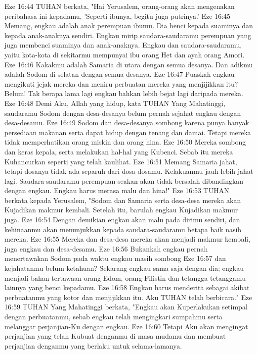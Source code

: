 Eze 16:44  TUHAN berkata, "Hai Yerusalem, orang-orang akan mengenakan peribahasa ini kepadamu, 'Seperti ibunya, begitu juga putrinya.'
Eze 16:45  Memang, engkau adalah anak perempuan ibumu. Dia benci kepada suaminya dan kepada anak-anaknya sendiri. Engkau mirip saudara-saudaramu perempuan yang juga membenci suaminya dan anak-anaknya. Engkau dan saudara-saudaramu, yaitu kota-kota di sekitarmu mempunyai ibu orang Het dan ayah orang Amori.
Eze 16:46  Kakakmu adalah Samaria di utara dengan semua desanya. Dan adikmu adalah Sodom di selatan dengan semua desanya.
Eze 16:47  Puaskah engkau mengikuti jejak mereka dan meniru perbuatan mereka yang menjijikkan itu? Belum! Tak berapa lama lagi engkau bahkan lebih bejat lagi daripada mereka.
Eze 16:48  Demi Aku, Allah yang hidup, kata TUHAN Yang Mahatinggi, saudaramu Sodom dengan desa-desanya belum pernah sejahat engkau dengan desa-desamu.
Eze 16:49  Sodom dan desa-desanya sombong karena punya banyak persediaan makanan serta dapat hidup dengan tenang dan damai. Tetapi mereka tidak memperhatikan orang miskin dan orang hina.
Eze 16:50  Mereka sombong dan keras kepala, serta melakukan hal-hal yang Kubenci. Sebab itu mereka Kuhancurkan seperti yang telah kaulihat.
Eze 16:51  Memang Samaria jahat, tetapi dosanya tidak ada separuh dari dosa-dosamu. Kelakuanmu jauh lebih jahat lagi. Saudara-saudaramu perempuan seakan-akan tidak bersalah dibandingkan dengan engkau. Engkau harus merasa malu dan hina!"
Eze 16:53  TUHAN berkata kepada Yerusalem, "Sodom dan Samaria serta desa-desa mereka akan Kujadikan makmur kembali. Setelah itu, barulah engkau Kujadikan makmur juga.
Eze 16:54  Dengan demikian engkau akan malu pada dirimu sendiri, dan kehinaanmu akan menunjukkan kepada saudara-saudaramu betapa baik nasib mereka.
Eze 16:55  Mereka dan desa-desa mereka akan menjadi makmur kembali, juga engkau dan desa-desamu.
Eze 16:56  Bukankah engkau pernah menertawakan Sodom pada waktu engkau masih sombong
Eze 16:57  dan kejahatanmu belum ketahuan? Sekarang engkau sama saja dengan dia; engkau menjadi bahan tertawaan orang Edom, orang Filistin dan tetangga-tetanggamu lainnya yang benci kepadamu.
Eze 16:58  Engkau harus menderita sebagai akibat perbuatanmu yang kotor dan menjijikkan itu. Aku TUHAN telah berbicara."
Eze 16:59  TUHAN Yang Mahatinggi berkata, "Engkau akan Kuperlakukan setimpal dengan perbuatanmu, sebab engkau telah mengingkari sumpahmu serta melanggar perjanjian-Ku dengan engkau.
Eze 16:60  Tetapi Aku akan mengingat perjanjian yang telah Kubuat denganmu di masa mudamu dan membuat perjanjian denganmu yang berlaku untuk selama-lamanya.
